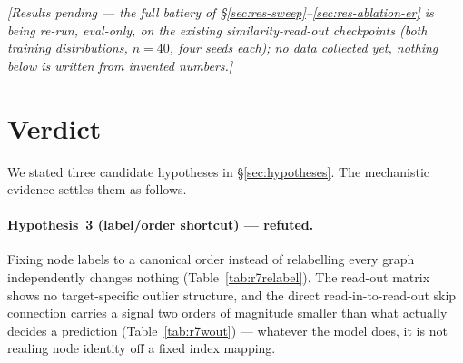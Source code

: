 \documentclass[11pt,a4paper]{article}
\begin{document}
\emph{[Results pending --- the full battery of \S\ref{sec:res-sweep}--\ref{sec:res-ablation-er}
is being re-run, eval-only, on the existing similarity-read-out checkpoints (both training
distributions, $n=40$, four seeds each); no data collected yet, nothing below is written from
invented numbers.]}

\section{Verdict}
\label{sec:verdict}

We stated three candidate hypotheses in \S\ref{sec:hypotheses}. The mechanistic
evidence settles them as follows.

\paragraph{Hypothesis~3 (label/order shortcut) --- refuted.} Fixing node labels
to a canonical order instead of relabelling every graph independently changes
nothing (Table~\ref{tab:r7relabel}). The read-out matrix shows no
target-specific outlier structure, and the direct read-in-to-read-out skip
connection carries a signal two orders of magnitude smaller than what actually
decides a prediction (Table~\ref{tab:r7wout}) --- whatever the model does, it
is not reading node identity off a fixed index mapping.
\end{document}
